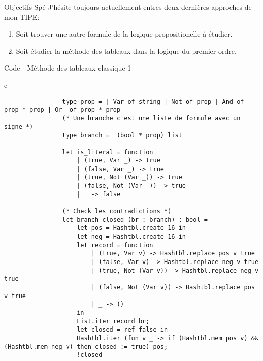 \documentclass[]{beamer}
\begin{document}
\begin{frame}{Objectifs Spé}
    J'hésite toujours actuellement entres deux dernières approches de mon TIPE:
    \begin{enumerate}
        \item Soit trouver une autre formule de la logique propositionelle à étudier.
        \item Soit étudier la méthode des tableaux dans la logique du premier ordre.
    \end{enumerate}
\end{frame}

\begin{frame}[fragile]{Code - Méthode des tableaux classique 1}
    \begin{center}
        \begin{tabular}{c}
            \begin{lstlisting}
                type prop = | Var of string | Not of prop | And of prop * prop | Or  of prop * prop
                (* Une branche c'est une liste de formule avec un signe *)
                type branch =  (bool * prop) list

                let is_literal = function
                    | (true, Var _) -> true
                    | (false, Var _) -> true
                    | (true, Not (Var _)) -> true
                    | (false, Not (Var _)) -> true
                    | _ -> false
            
                (* Check les contradictions *)
                let branch_closed (br : branch) : bool =
                    let pos = Hashtbl.create 16 in
                    let neg = Hashtbl.create 16 in
                    let record = function
                        | (true, Var v) -> Hashtbl.replace pos v true
                        | (false, Var v) -> Hashtbl.replace neg v true
                        | (true, Not (Var v)) -> Hashtbl.replace neg v true
                        | (false, Not (Var v)) -> Hashtbl.replace pos v true
                        | _ -> ()
                    in
                    List.iter record br;
                    let closed = ref false in
                    Hashtbl.iter (fun v _ -> if (Hashtbl.mem pos v) && (Hashtbl.mem neg v) then closed := true) pos;
                    !closed
            \end{lstlisting}
        \end{tabular}
      \end{center}
\end{frame}
\end{document}
